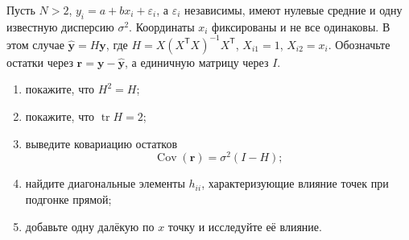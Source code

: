 \documentclass[
  russian,
  11pt,
  a4paper,
  open=any]{scrbook}
\providecommand{\tightlist}{%
  \setlength{\itemsep}{0pt}\setlength{\parskip}{0pt}}
\begin{document}
\begin{semanticpdfbox}[colback=BookCoralSoft,borderline west={1.2mm}{0pt}{BookCoral}]

\par\nopagebreak[4]\vspace{1.2mm}

Пусть \(N>2\), \(y_i=a+bx_i+\varepsilon_i\), а \(\varepsilon_i\)
независимы, имеют нулевые средние и одну известную дисперсию
\(\sigma^2\). Координаты \(x_i\) фиксированы и не все одинаковы. В этом
случае \(\widehat{\mathbf y}=H\mathbf y\), где
\(H=X(X^{\mathsf T}X)^{-1}X^{\mathsf T}\), \(X_{i1}=1\), \(X_{i2}=x_i\).
Обозначьте остатки через \(\mathbf r=\mathbf y-\widehat{\mathbf y}\), а
единичную матрицу через \(I\).

\begin{enumerate}
\def\labelenumi{\arabic{enumi}.}
\tightlist
\item
  покажите, что \(H^2=H\);
\item
  покажите, что \(\operatorname{tr}H=2\);
\item
  выведите ковариацию остатков \[
  \operatorname{Cov}(\mathbf r)=\sigma^2(I-H);
  \]
\item
  найдите диагональные элементы \(h_{ii}\), характеризующие влияние
  точек при подгонке прямой;
\item
  добавьте одну далёкую по \(x\) точку и исследуйте её влияние.
\end{enumerate}

\end{semanticpdfbox}
\end{document}

